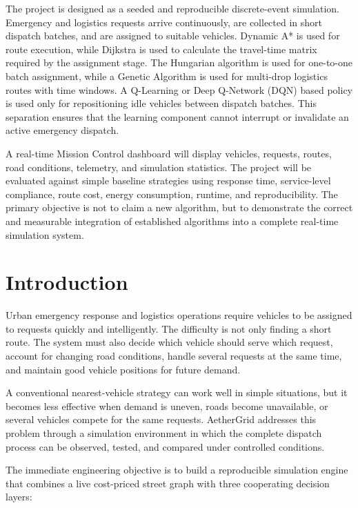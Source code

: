 \documentclass[12pt,a4paper]{article}
\begin{document}
The project is designed as a seeded and reproducible discrete-event
simulation. Emergency and logistics requests arrive continuously,
are collected in short dispatch batches, and are assigned to suitable
vehicles. Dynamic A* is used for route execution, while Dijkstra is
used to calculate the travel-time matrix required by the assignment
stage. The Hungarian algorithm is used for one-to-one batch
assignment, while a Genetic Algorithm is used for multi-drop
logistics routes with time windows. A Q-Learning or Deep Q-Network
(DQN) based policy is used only for repositioning idle vehicles
between dispatch batches. This separation ensures that the learning
component cannot interrupt or invalidate an active emergency
dispatch.

A real-time Mission Control dashboard will display vehicles,
requests, routes, road conditions, telemetry, and simulation
statistics. The project will be evaluated against simple baseline
strategies using response time, service-level compliance, route
cost, energy consumption, runtime, and reproducibility. The primary
objective is not to claim a new algorithm, but to demonstrate the
correct and measurable integration of established algorithms into a
complete real-time simulation system.





\section{Introduction}

Urban emergency response and logistics operations require vehicles to
be assigned to requests quickly and intelligently. The difficulty is
not only finding a short route. The system must also decide which
vehicle should serve which request, account for changing road
conditions, handle several requests at the same time, and maintain
good vehicle positions for future demand.

A conventional nearest-vehicle strategy can work well in simple
situations, but it becomes less effective when demand is uneven,
roads become unavailable, or several vehicles compete for the same
requests. AetherGrid addresses this problem through a simulation
environment in which the complete dispatch process can be observed,
tested, and compared under controlled conditions.

The immediate engineering objective is to build a reproducible
simulation engine that combines a live cost-priced street graph with
three cooperating decision layers:
\end{document}
